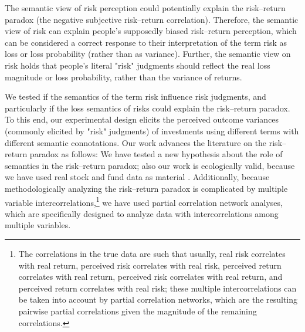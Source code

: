 \documentclass[a4paper,man, natbib,floatsintext]{apa6} %
\begin{document}
The semantic view of risk perception could potentially explain the risk--return paradox (the negative subjective risk--return correlation).  Therefore, the semantic view of risk can explain people's supposedly biased risk--return perception, which can be considered a correct response to their interpretation of the term risk as loss or loss probability (rather than as variance). Further, the semantic view on risk holds that people's literal "risk" judgments should reflect the real loss magnitude or loss probability, rather than the variance of returns.

We tested if the semantics of the term risk influence risk judgments, and particularly if the loss semantics of risks could explain the risk--return paradox. To this end, our experimental design elicits the perceived outcome variances (commonly elicited by "risk" judgments) of investments using different terms with different semantic connotations. Our work advances the literature on the risk--return paradox as follows: We have tested a new hypothesis about the role of semantics in the risk--return paradox; also our work is ecologically valid, because we have used real stock and fund data as material \citep[as have][]{Kempf2014}.  Additionally, because methodologically analyzing the risk--return paradox is complicated by multiple variable intercorrelations,\footnote{The correlations in the true data are such that usually, real risk correlates with real return, perceived risk correlates with real risk,  perceived return correlates with real return, perceived risk correlates with real return, and perceived return correlates with real risk; these multiple intercorrelations can be taken into account by partial correlation networks, which are the resulting pairwise partial correlations given the magnitude of the remaining correlations.} we have used partial correlation network analyses, which are specifically designed to analyze data with intercorrelations among multiple variables.
\end{document}
